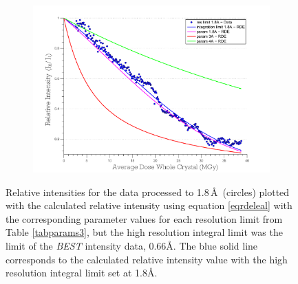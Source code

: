 \begin{figure}
\ContinuedFloat
    \begin{subfigure}[b]{1\textwidth}
        \centering
        \includegraphics[width=\textwidth]{figures/dwd/rescmpplot3.pdf}
        \caption{}
        \label{fig:Resolution comparison plot - integrated to diff res}
    \end{subfigure}
	\caption{Relative intensities for the data processed to 1.8\,\AA\ (circles) plotted with the calculated relative intensity using equation \ref{eqrdeleal} with the corresponding parameter values for each resolution limit from Table \ref{tabparams3}, but the high resolution integral limit was the limit of the \emph{BEST} intensity data, 0.66\AA. The blue solid line corresponds to the calculated relative intensity value with the high resolution integral limit set at 1.8\AA.}
	\label{figrescont1}
\end{figure}
